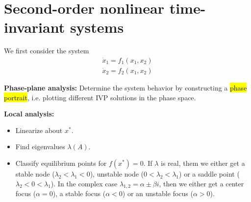 \section{Second-order nonlinear time-invariant systems}
We first consider the system
\begin{equation}
\begin{array}{l}{\dot{x}_{1}=f_{1}\left(x_{1}, x_{2}\right)} \\ {\dot{x}_{2}=f_{2}\left(x_{1}, x_{2}\right)}\end{array}
\end{equation}

\textbf{Phase-plane analysis:} Determine the system behavior by constructing a \hl{phase portrait}, i.e. plotting different IVP solutions in the phase space.

\begin{tcolorbox}[colback=white, colframe=teal]
\textbf{Local analysis:}
\begin{itemize}[topsep=0pt]
    \item Linearize about $x^*$.
    \item Find eigenvalues $\lambda(A)$.
    \item Classify equilibrium points for $f(x^*) = 0$.
    If $\lambda$ is real, them we either get a stable node ($\lambda_2 < \lambda_1 < 0$), unstable node ($0 < \lambda_2 < \lambda_1$) or a saddle point ($\lambda_2 < 0 < \lambda_1$).
    In the complex case $\lambda_{1,2} = \alpha \pm \beta i$, then we either get a center focus ($\alpha = 0$), a stable focus ($\alpha < 0$) or an unstable focus ($\alpha > 0$).
\end{itemize}
\end{tcolorbox}

